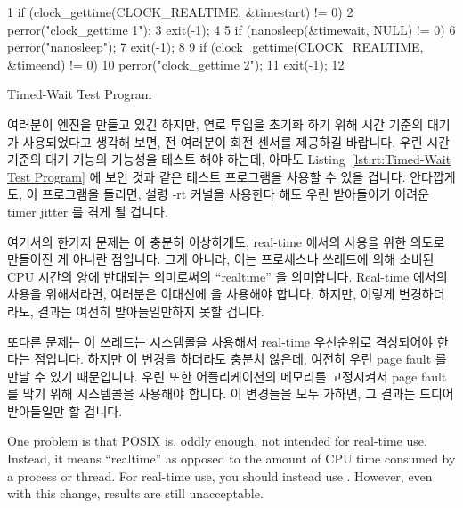 \begin{listing}[tb]
{ \scriptsize
\begin{verbbox}
 1 if (clock_gettime(CLOCK_REALTIME, &timestart) != 0) {
 2   perror("clock_gettime 1");
 3   exit(-1);
 4 }
 5 if (nanosleep(&timewait, NULL) != 0) {
 6   perror("nanosleep");
 7   exit(-1);
 8 }
 9 if (clock_gettime(CLOCK_REALTIME, &timeend) != 0) {
10   perror("clock_gettime 2");
11   exit(-1);
12 }
\end{verbbox}
}
\centering
\theverbbox
\caption{Timed-Wait Test Program}
\label{lst:advsync:Timed-Wait Test Program}
\end{listing}

여러분이 엔진을 만들고 있긴 하지만, 연로 투입을 초기화 하기 위해 시간 기준의
대기가 사용되었다고 생각해 보면, 전 여러분이 회전 센서를 제공하길 바랍니다.
우린 시간 기준의 대기 기능의 기능성을 테스트 해야 하는데, 아마도
Listing~\ref{lst:rt:Timed-Wait Test Program} 에 보인 것과 같은 테스트 프로그램을
사용할 수 있을 겁니다.
안타깝게도, 이 프로그램을 돌리면, 설령 -rt 커널을 사용한다 해도 우린 받아들이기
어려운 timer jitter 를 겪게 될 겁니다.

여기서의 한가지 문제는  이 충분히 이상하게도, real-time
에서의 사용을 위한 의도로 만들어진 게 아니란 점입니다.
그게 아니라, 이는 프로세스나 쓰레드에 의해 소비된 CPU 시간의 양에 반대되는
의미로써의 ``realtime'' 을 의미합니다.
Real-time 에서의 사용을 위해서라면, 여러분은 이대신에  을
사용해야 합니다.
하지만, 이렇게 변경하더라도, 결과는 여전히 받아들일만하지 못할 겁니다.

또다른 문제는 이 쓰레드는  시스템콜을 사용해서
real-time 우선순위로 격상되어야 한다는 점입니다.
하지만 이 변경을 하더라도 충분치 않은데, 여전히 우린 page fault 를 만날 수 있기
때문입니다.
우린 또한 어플리케이션의 메모리를 고정시켜서 page fault 를 막기 위해
 시스템콜을 사용해야 합니다.
이 변경들을 모두 가하면, 그 결과는 드디어 받아들일만 할 겁니다.
\iffalse

One problem is that POSIX  is, oddly enough, not intended
for real-time use.
Instead, it means ``realtime'' as opposed to the amount of CPU time
consumed by a process or thread.
For real-time use, you should instead use .
However, even with this change, results are still unacceptable.

